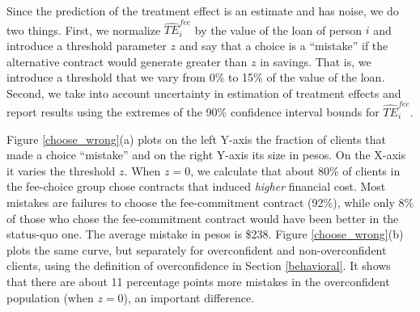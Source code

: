 \documentclass[oneside,11pt]{article}
\begin{document}


Since the prediction of the treatment effect is an estimate and has noise, we do two things. First, we normalize $\widehat{TE}^{fee}_{i}$ by the value of the loan of person $i$ and introduce a threshold parameter $z$ and say that a choice is a ``mistake'' if the alternative contract would generate greater than $z$ in savings. That is, we introduce a threshold that we vary from 0\% to 15\% of the value of the loan. Second, we take into account uncertainty in estimation of treatment effects and report results using the extremes of the 90\% confidence interval bounds for $\widehat{TE}^{fee}_{i}$. 

Figure \ref{choose_wrong}(a) plots on the left Y-axis the fraction of clients that made a choice ``mistake'' and on the right Y-axis its size in pesos. On the X-axis it varies the threshold $z$. When $z=0$, we calculate that about 80\% of clients in the fee-choice group chose contracts that induced \textit{higher} financial cost.  %
Most mistakes are failures to choose the fee-commitment contract (92\%), while only 8\% of those who chose the fee-commitment contract would have been better in the status-quo one. The average mistake in pesos is \$238. %
Figure \ref{choose_wrong}(b) plots the same curve, but separately for overconfident and non-overconfident clients, using the definition of overconfidence in Section \ref{behavioral}. It shows that there are about 11 percentage points more mistakes in the overconfident population (when $z=0$), an important difference.
\end{document}

